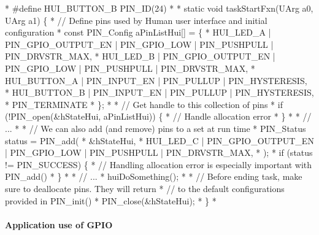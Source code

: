 \begin{DoxyCode}
*    #define HUI\_BUTTON\_B  PIN_ID(24)
*
*    \textcolor{keyword}{static} \textcolor{keywordtype}{void} taskStartFxn(UArg a0, UArg a1) \{
*        \textcolor{comment}{// Define pins used by Human user interface and initial configuration}
*        \textcolor{keyword}{const} PIN_Config aPinListHui[] = \{
*            HUI\_LED\_A    | PIN_GPIO_OUTPUT_EN | PIN_GPIO_LOW | PIN_PUSHPULL | 
      PIN_DRVSTR_MAX,
*            HUI\_LED\_B    | PIN_GPIO_OUTPUT_EN | PIN_GPIO_LOW | PIN_PUSHPULL | 
      PIN_DRVSTR_MAX,
*            HUI\_BUTTON\_A | PIN_INPUT_EN  | PIN_PULLUP | PIN_HYSTERESIS,
*            HUI\_BUTTON\_B | PIN_INPUT_EN  | PIN_PULLUP | PIN_HYSTERESIS,
*            PIN_TERMINATE
*        \};
*
*        \textcolor{comment}{// Get handle to this collection of pins}
*        \textcolor{keywordflow}{if} (!PIN_open(&hStateHui, aPinListHui)) \{
*            \textcolor{comment}{// Handle allocation error}
*        \}
*
*        \textcolor{comment}{// ...}
*
*        \textcolor{comment}{// We can also add (and remove) pins to a set at run time}
*        PIN_Status status = PIN_add(
*          &hStateHui,
*          HUI\_LED\_C | PIN_GPIO_OUTPUT_EN | PIN_GPIO_LOW | PIN_PUSHPULL | 
      PIN_DRVSTR_MAX,
*        );
*        \textcolor{keywordflow}{if} (status != PIN_SUCCESS) \{
*            \textcolor{comment}{// Handling allocation error is especially important with PIN\_add()}
*        \}
*
*        \textcolor{comment}{// ...}
*        huiDoSomething();
*
*        \textcolor{comment}{// Before ending task, make sure to deallocate pins. They will return}
*        \textcolor{comment}{// to the default configurations provided in PIN\_init()}
*        PIN_close(&hStateHui);
*    \}
*    
\end{DoxyCode}


\paragraph*{Application use of G\-P\-I\-O}

